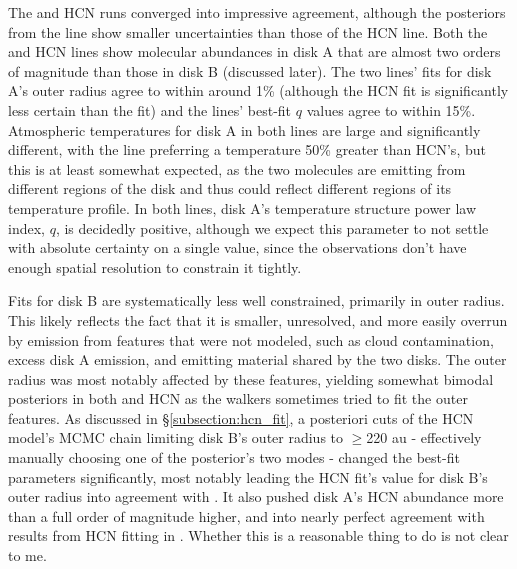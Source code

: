 The \hco and HCN runs converged into impressive agreement, although the posteriors from the \hco line show smaller uncertainties than those of the HCN line. Both the \hco and HCN lines show molecular abundances in disk A that are almost two orders of magnitude than those in disk B (discussed later). The two lines' fits for disk A's outer radius agree to within around 1\% (although the HCN fit is significantly less certain than the \hco fit) and the lines' best-fit $q$ values agree to within 15\%. Atmospheric temperatures for disk A in both lines are large and significantly different, with the \hco line preferring a temperature 50\% greater than HCN's, but this is at least somewhat expected, as the two molecules are emitting from different regions of the disk and thus could reflect different regions of its temperature profile. In both lines, disk A's temperature structure power law index, $q$, is decidedly positive, although we expect this parameter to not settle with absolute certainty on a single value, since the observations don't have enough spatial resolution to constrain it tightly.


Fits for disk B are systematically less well constrained, primarily in outer radius. This likely reflects the fact that it is smaller, unresolved, and more easily overrun by emission from features that were not modeled, such as cloud contamination, excess disk A emission, and emitting material shared by the two disks. The outer radius was most notably affected by these features, yielding somewhat bimodal posteriors in both \hco and HCN as the walkers sometimes tried to fit the outer features. As discussed in \S\ref{subsection:hcn_fit}, a posteriori cuts of the HCN model's MCMC chain limiting disk B's outer radius to $\geq$220 au - effectively manually choosing one of the posterior's two modes -  changed the best-fit parameters significantly, most notably leading the HCN fit's value for disk B's outer radius into agreement with \hco. It also pushed disk A's HCN abundance more than a full order of magnitude higher, and into nearly perfect agreement with results from HCN fitting in \citet{Factor2017}. Whether this is a reasonable thing to do is not clear to me.






